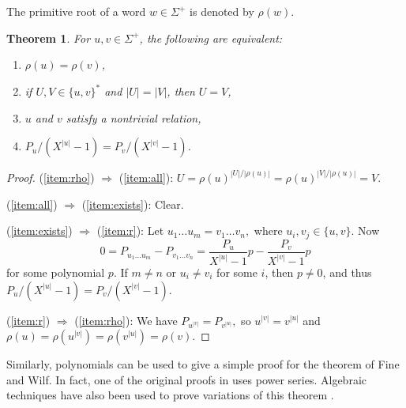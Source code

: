 \documentclass[submission]{eptcs}
\newtheorem{theorem}{Theorem}[section]
\theoremstyle{definition}
\newcommand{\px}[1]{ P_{#1} }
\begin{document}
The primitive root of a word $w \in \Sigma^+$ is denoted by
$\rho(w)$.

\begin{theorem} \label{thm:commutation}
For $u,v \in \Sigma^+$, the following are equivalent:
\begin{enumerate}
\item $\rho(u) = \rho(v)$, \label{item:rho}
\item if $U,V \in \{u,v\}^*$ and $|U| = |V|$, then $U = V$, \label{item:all}
\item $u$ and $v$ satisfy a nontrivial relation, \label{item:exists}
\item $\px{u} / (X^{|u|} - 1) = \px{v} / (X^{|v|} - 1)$. \label{item:r}
\end{enumerate}
\end{theorem}
\begin{proof}
(\ref{item:rho}) $\Rightarrow$ (\ref{item:all}):
\begin{math}
    U = \rho(u)^{|U|/|\rho(u)|}
    = \rho(u)^{|V|/|\rho(u)|} = V .
\end{math}

(\ref{item:all}) $\Rightarrow$ (\ref{item:exists}): Clear.

(\ref{item:exists}) $\Rightarrow$ (\ref{item:r}): Let
\begin{math}
    u_1 \dots u_m = v_1 \dots v_n,
\end{math}
where $u_i, v_j \in \{u,v\}$. Now
\begin{equation*}
    0 = \px{u_1 \dots u_m} - \px{v_1 \dots v_n}
= \frac{\px{u}}{X^{|u|} - 1} p - \frac{\px{v}}{X^{|v|} - 1} p
\end{equation*}
for some polynomial $p$. If $m \ne n$ or $u_i \ne v_i$ for some $i$,
then $p \ne 0$, and thus $\px{u} / (X^{|u|} - 1) = \px{v} / (X^{|v|}
- 1)$.

(\ref{item:r}) $\Rightarrow$ (\ref{item:rho}): We have
\begin{math}
    \px{u^{|v|}}
= \px{v^{|u|}} ,
\end{math}
so $u^{|v|} = v^{|u|}$ and
\begin{math}
    \rho(u) = \rho(u^{|v|}) = \rho(v^{|u|}) = \rho(v) .
\end{math}
\end{proof}

Similarly, polynomials can be used to give a simple proof for the
theorem of Fine and Wilf. In fact, one of the original proofs in
\cite{FiWi65} uses power series. Algebraic techniques have also been
used to prove variations of this theorem \cite{MiShWa01}.
\end{document}
